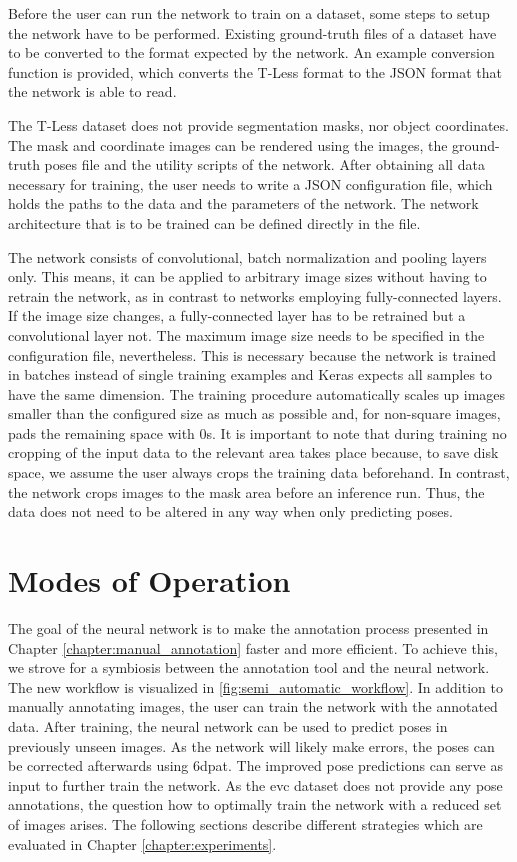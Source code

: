 Before the user can run the network to train on a dataset, some steps to setup the network have to be performed. Existing ground-truth files of a dataset have to be converted to the format expected by the network. An example conversion function is provided, which converts the T-Less format to the JSON format that the network is able to read. 

The T-Less dataset does not provide segmentation masks, nor object coordinates. The mask and coordinate images can be rendered using the images, the ground-truth poses file and the utility scripts of the network. After obtaining all data necessary for training, the user needs to write a JSON configuration file, which holds the paths to the data and the parameters of the network. The network architecture that is to be trained can be defined directly in the file. 

The network consists of convolutional, batch normalization and pooling layers only. This means, it can be applied to arbitrary image sizes without having to retrain the network, as in contrast to networks employing fully-connected layers. If the image size changes, a fully-connected layer has to be retrained but a convolutional layer not. The maximum image size needs to be specified in the configuration file, nevertheless. This is necessary because the network is trained in batches instead of single training examples and Keras expects all samples to have the same dimension. The training procedure automatically scales up images smaller than the configured size as much as possible and, for non-square images, pads the remaining space with 0s. It is important to note that during training no cropping of the input data to the relevant area takes place because, to save disk space, we assume the user always crops the training data beforehand. In contrast, the network crops images to the mask area before an inference run. Thus, the data does not need to be altered in any way when only predicting poses.

\section{Modes of Operation} \label{section:modes_of_operation}

The goal of the neural network is to make the annotation process presented in Chapter \ref{chapter:manual_annotation} faster and more efficient. To achieve this, we strove for a symbiosis between the annotation tool and the neural network. The new workflow is visualized in \fig \ref{fig:semi_automatic_workflow}. In addition to manually annotating images, the user can train the network with the annotated data. After training, the neural network can be used to predict poses in previously unseen images. As the network will likely make errors, the poses can be corrected afterwards using \ac{6dpat}. The improved pose predictions can serve as input to further train the network. As the \ac{evc} dataset does not provide any pose annotations, the question how to optimally train the network with a reduced set of images arises. The following sections describe different strategies which are evaluated in Chapter \ref{chapter:experiments}.


